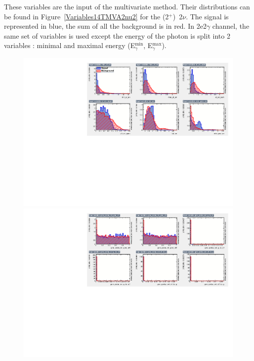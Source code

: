 \documentclass[main.tex]{subfiles}
\begin{document}
\NI These variables are the input of the multivariate method. Their distributions can be found in Figure~\ref{Variables14TMVA2nu2} for the (2$^+$)~2$\nu$. The signal is represented in blue, the sum of all the background is in red. In 2e2$\gamma$ channel, the same set of variables  is used except the energy of the photon is split into 2 variables : minimal and maximal energy (E$_{\gamma}^{\text{min}}$, E$_{\gamma}^{\text{max}}$).

\begin{figure} [h!]
\begin{center}
\includegraphics[scale=0.59]{pictures/FinalResults/bb2nu2/150/preselection/variablesBB2nu_2_a.pdf}
\includegraphics[scale=0.59]{pictures/FinalResults/bb2nu2/150/preselection/variablesBB2nu_2_b.pdf}

\end{center}
\end{figure}
\end{document}
